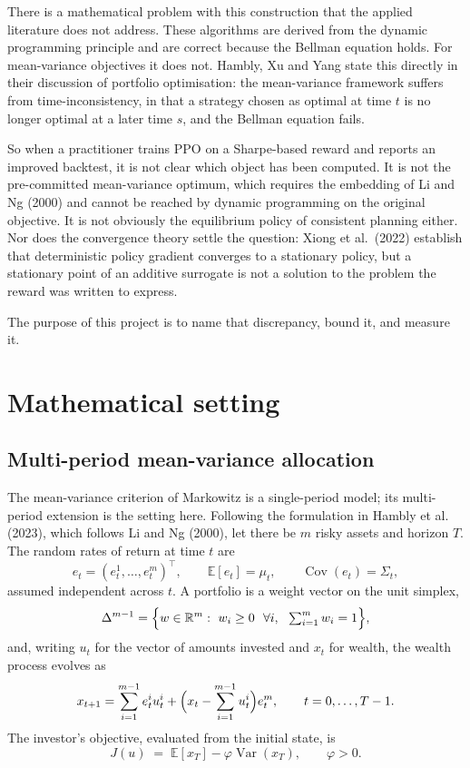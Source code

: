 \documentclass[11pt,a4paper]{article}
\theoremstyle{plain}
\theoremstyle{definition}
\newcommand{\R}{\mathbb{R}}
\newcommand{\E}{\mathbb{E}}
\newcommand{\Var}{\operatorname{Var}}
\newcommand{\simplex}{\Delta^{m-1}}
\begin{document}
There is a mathematical problem with this construction that the applied literature does
not address. These algorithms are derived from the dynamic programming principle and
are correct because the Bellman equation holds. For mean-variance objectives it does
not. Hambly, Xu and Yang state this directly in their discussion of portfolio
optimisation: the mean-variance framework suffers from time-inconsistency, in that a
strategy chosen as optimal at time $t$ is no longer optimal at a later time $s$, and the
Bellman equation fails.

So when a practitioner trains PPO on a Sharpe-based reward and reports an improved
backtest, it is not clear which object has been computed. It is not the pre-committed
mean-variance optimum, which requires the embedding of Li and Ng (2000) and cannot be reached
by dynamic programming on the original objective. It is not obviously the equilibrium
policy of consistent planning either. Nor does the convergence theory settle the
question: Xiong et al.\ (2022) establish that deterministic policy gradient converges to
a stationary policy, but a stationary point of an additive surrogate is not a solution to
the problem the reward was written to express.

The purpose of this project is to name that discrepancy, bound it, and measure it.

\section{Mathematical setting}

\subsection{Multi-period mean-variance allocation}

The mean-variance criterion of Markowitz is a single-period model; its multi-period
extension is the setting here. Following the formulation in Hambly et al. (2023),
which follows Li and Ng (2000), let there be $m$ risky assets and horizon $T$. The
random rates of return at time $t$ are
\begin{equation}
e_t=(e_t^1,\dots,e_t^m)^\top,\qquad \E[e_t]=\mu_t,\qquad \operatorname{Cov}(e_t)=\Sigma_t,
\end{equation}
assumed independent across $t$. A portfolio is a weight vector on the unit simplex,
\begin{equation}
\simplex=\Bigl\{w\in\R^m:\ w_i\ge 0\ \ \forall i,\ \ \textstyle\sum_{i=1}^m w_i=1\Bigr\},
\end{equation}
and, writing $u_t$ for the vector of amounts invested and $x_t$ for wealth, the wealth
process evolves as
\begin{equation}
x_{t+1}=\sum_{i=1}^{m-1} e_t^i u_t^i+\Bigl(x_t-\sum_{i=1}^{m-1}u_t^i\Bigr)e_t^m,
\qquad t=0,\dots,T-1 .
\end{equation}
The investor's objective, evaluated from the initial state, is
\begin{equation}
J(u)\;=\;\E[x_T]-\varphi\Var(x_T),\qquad \varphi>0 .
\label{eq:mv}
\end{equation}
\end{document}
